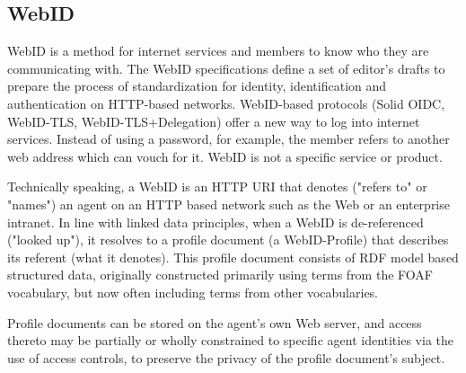 \subsection*{WebID}
WebID is a method for internet services and members to know who they are communicating with. The WebID specifications define a set of editor's drafts to prepare the process of standardization for identity, identification and authentication on HTTP-based networks. WebID-based protocols (Solid OIDC, WebID-TLS, WebID-TLS+Delegation) offer a new way to log into internet services. Instead of using a password, for example, the member refers to another web address which can vouch for it. WebID is not a specific service or product.

Technically speaking, a WebID is an HTTP URI that denotes ("refers to" or "names") an agent on an HTTP based network such as the Web or an enterprise intranet. In line with linked data principles, when a WebID is de-referenced ("looked up"), it resolves to a profile document (a WebID-Profile) that describes its referent (what it denotes). This profile document consists of RDF model based structured data, originally constructed primarily using terms from the FOAF vocabulary, but now often including terms from other vocabularies.

Profile documents can be stored on the agent's own Web server, and access thereto may be partially or wholly constrained to specific agent identities via the use of access controls, to preserve the privacy of the profile document's subject.
